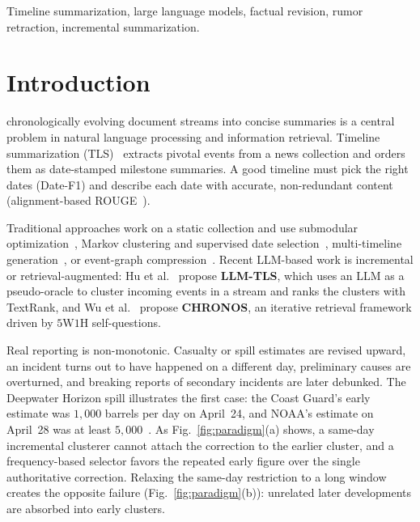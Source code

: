 \documentclass[journal]{IEEEtran}
\begin{document}
\begin{IEEEkeywords}
Timeline summarization, large language models, factual revision, rumor retraction, incremental summarization.
\end{IEEEkeywords}

\section{Introduction}
\label{sec:intro}

 chronologically evolving document streams into concise summaries is a central problem in natural language processing and information retrieval. Timeline summarization (TLS)~\cite{tran2013leveraging, martschat2018temporally, ghalandari2020examining} extracts pivotal events from a news collection and orders them as date-stamped milestone summaries. A good timeline must pick the right dates (Date-F1) and describe each date with accurate, non-redundant content (alignment-based ROUGE~\cite{martschat2017improving}).

Traditional approaches work on a static collection and use submodular optimization~\cite{martschat2018temporally}, Markov clustering and supervised date selection~\cite{ghalandari2020examining}, multi-timeline generation~\cite{yu2021multi}, or event-graph compression~\cite{li2021timeline}. Recent LLM-based work is incremental or retrieval-augmented: Hu et al.~\cite{hu2024moments} propose \textbf{LLM-TLS}, which uses an LLM as a pseudo-oracle to cluster incoming events in a stream and ranks the clusters with TextRank, and Wu et al.~\cite{wu2025unfolding} propose \textbf{CHRONOS}, an iterative retrieval framework driven by $5\text{W}1\text{H}$ self-questions.



Real reporting is non-monotonic. Casualty or spill estimates are revised upward, an incident turns out to have happened on a different day, preliminary causes are overturned, and breaking reports of secondary incidents are later debunked. The Deepwater Horizon spill illustrates the first case: the Coast Guard's early estimate was $1{,}000$ barrels per day on April~24, and NOAA's estimate on April~28 was at least $5{,}000$~\cite{uscg2011onscene}. As Fig.~\ref{fig:paradigm}(a) shows, a same-day incremental clusterer cannot attach the correction to the earlier cluster, and a frequency-based selector favors the repeated early figure over the single authoritative correction. Relaxing the same-day restriction to a long window creates the opposite failure (Fig.~\ref{fig:paradigm}(b)): unrelated later developments are absorbed into early clusters.
\end{document}
